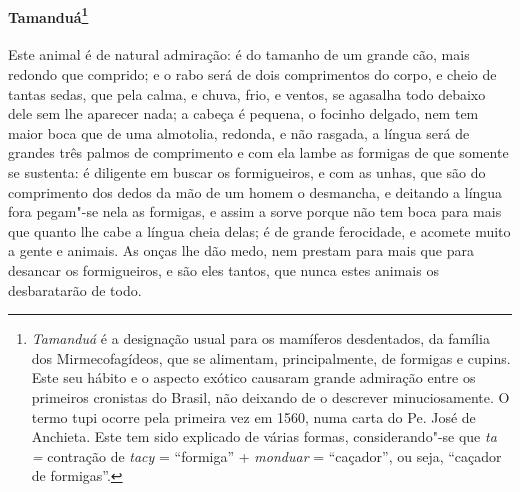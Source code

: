 \paragraph{Tamanduá\footnote{ \textit{Tamanduá} é a designação
usual para os mamíferos desdentados, da família dos Mirmecofagídeos,
que se alimentam, principalmente, de formigas e cupins. Este seu hábito
e o aspecto exótico causaram grande admiração entre os primeiros
cronistas do Brasil, não deixando de o descrever minuciosamente. O
termo tupi ocorre pela primeira vez em 1560, numa carta do Pe.
José de Anchieta. Este tem sido explicado de várias formas,
considerando"-se que \textit{ta =} contração de \textit{tacy} = 
``formiga'' + \textit{monduar} = ``caçador'', ou seja, ``caçador de
formigas''.}} Este animal é de natural admiração: é do tamanho
de um grande cão, mais redondo que comprido; e o rabo será de dois
comprimentos do corpo, e cheio de tantas sedas, que pela calma, e
chuva, frio, e ventos, se agasalha todo debaixo dele sem lhe aparecer
nada; a cabeça é pequena, o focinho delgado, nem tem maior boca que de
uma almotolia, redonda, e não rasgada, a língua será de grandes três
palmos de comprimento e com ela lambe as formigas de que somente se
sustenta: é diligente em buscar os formigueiros, e com as unhas, que
são do comprimento dos dedos da mão de um homem o desmancha, e deitando
a língua fora pegam"-se nela as formigas, e assim a sorve porque não tem
boca para mais que quanto lhe cabe a língua cheia delas; é de grande
ferocidade, e acomete muito a gente e animais. As onças lhe dão medo,
nem prestam para mais que para desancar os formigueiros, e são eles
tantos, que nunca estes animais os desbaratarão de todo.

